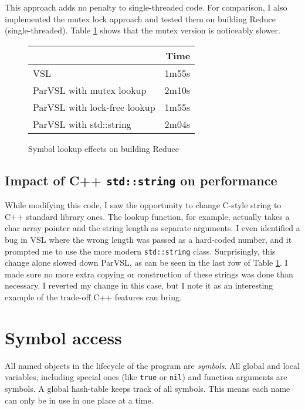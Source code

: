 This approach adds no penalty to single-threaded
code. For comparison, I also implemented the mutex lock approach and tested
them on building Reduce (single-threaded). Table \ref{fig:lockfree} shows that the mutex
version is noticeably slower.

\begin{figure}
  \centering
  \begin{tabular}{lr}
                               & Time \\
  \hline
  VSL                          & 1m55s \\
  ParVSL with mutex lookup     & 2m10s \\
  ParVSL with lock-free lookup & 1m55s \\
  ParVSL with std::string      & 2m04s
  \end{tabular}
  \label{fig:lockfree}
  \caption{Symbol lookup effects on building Reduce}
\end{figure}

\subsection{Impact of C++ \texttt{std::string} on performance}

While modifying this code, I saw the opportunity to change C-style string to C++
standard library ones. The lookup function, for example, actually takes a char array
pointer and the string length as separate arguments. I even identified a bug
in VSL where the wrong length was passed as a hard-coded number, and it prompted
me to use the more modern \verb|std::string| class. Surprisingly, this change alone
slowed down ParVSL, as can be seen in the last row of Table \ref{fig:lockfree}.
I made sure no more extra copying or construction of these strings was done than
necessary. I reverted my change in this case, but I note it as an interesting example
of the trade-off C++ features can bring.

\section{Symbol access}
\label{sec:symbols}

All named objects in the lifecycle of the program are \emph{symbols}. All global and local variables, including
special ones (like \texttt{true} or \texttt{nil}) and function arguments are symbols. A global hash-table keeps track of
all symbols. This means each name can only be in use in one place at a time.

